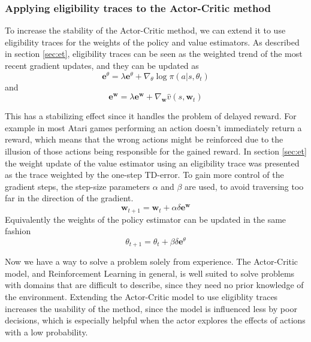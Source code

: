 \documentclass[11pt]{article}
\begin{document}

\newpage
\subsubsection{Applying eligibility traces to the Actor-Critic method}\label{sec:actor_critic_el}

To increase the stability of the Actor-Critic method, we can extend it to use eligibility traces
for the weights of the policy and value estimators.
As described in section \ref{sec:et}, eligibility traces can be seen as the weighted trend
of the most recent gradient updates, and they can be updated as
\begin{equation}
    \mathbf{e}^{\theta} = \lambda \mathbf{e}^{\theta} + \nabla_\theta \log\pi(a|s,\theta_t)
\end{equation}
and
\begin{equation}
    \mathbf{e}^{\mathbf{w}} = \lambda \mathbf{e}^{\mathbf{w}} + \nabla_\mathbf{w} \hat{v}(s, \mathbf{w}_t)
\end{equation}

This has a stabilizing effect since it handles the problem of delayed reward.
For example in most Atari games performing an action doesn't immediately return a reward,
which means that the wrong actions might be reinforced due to the illusion
of those actions being responsible for the gained reward.
In section \ref{sec:et} the weight update of the value estimator
using an eligibility trace was presented as the trace weighted by
the one-step TD-error.
To gain more control of the gradient steps, the step-size parameters $\alpha$ and $\beta$ are used,
to avoid traversing too far in the direction of the gradient.
\begin{equation*}
    \mathbf{w}_{t+1}= \mathbf{w}_t + \alpha \delta \mathbf{e}^{\mathbf{w}}
\end{equation*}
Equivalently the weights of the policy estimator can be updated in the same fashion
\begin{equation}
    \theta_{t+1} = \theta_t + \beta \delta \mathbf{e}^\theta
\end{equation}

Now we have a way to solve a problem solely from experience.
The Actor-Critic model, and Reinforcement Learning in general, is well suited
to solve problems with domains that are difficult to describe, since
they need no prior knowledge of the environment.
Extending the Actor-Critic model to use eligiblity traces 
increases the usability of the method, since the model is 
influenced less by poor decisions, which is especially helpful
when the actor explores the effects of actions with a low probability.

%
%
\end{document}
